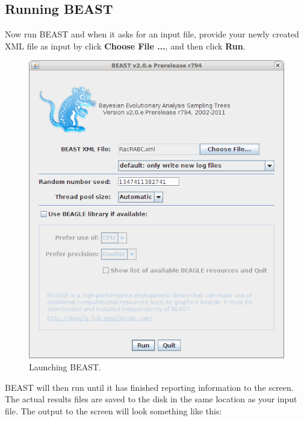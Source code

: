 \documentclass{article}
\begin{document}
\subsection*{Running BEAST }

Now run BEAST and when it asks for an input file, provide your newly
created XML file as input by click \textbf{Choose File ...}, and then click \textbf{Run}. 

\begin{figure}
\begin{center}

\includegraphics[scale=0.5]{figures/BEAST}

\end{center}
\caption{\label{fig.BEAST} Launching BEAST.}
\end{figure}


BEAST will then run until it has finished
reporting information to the screen. The actual results files are
saved to the disk in the same location as your input file. The output to the screen will
look something like this: 
\end{document}
